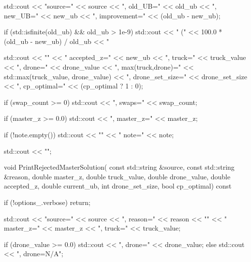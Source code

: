 {{{{                std::cout << " source=" << source
                          << ", old_UB=" << old_ub
                          << ", new_UB=" << new_ub
                          << ", improvement=" << (old_ub - new_ub);

                if (std::isfinite(old_ub) && old_ub > 1e-9)
                {
                    std::cout << " (" << 100.0 * (old_ub - new_ub) / old_ub << "%
                }

                std::cout << "\n"
                          << "           accepted_z=" << new_ub
                          << ", truck=" << truck_value
                          << ", drone=" << drone_value
                          << ", max(truck,drone)=" << std::max(truck_value, drone_value)
                          << ", drone_set_size=" << drone_set_size
                          << ", cp_optimal=" << (cp_optimal ? 1 : 0);

                if (swap_count >= 0)
                {
                    std::cout << ", swaps=" << swap_count;
                }

                if (master_z >= 0.0)
                {
                    std::cout << ", master_z=" << master_z;
                }

                if (!note.empty())
                {
                    std::cout << "\n"
                              << "           note=" << note;
                }

                std::cout << "\n";
            }

            void PrintRejectedMasterSolution(
                const std::string &source,
                const std::string &reason,
                double master_z,
                double truck_value,
                double drone_value,
                double accepted_z,
                double current_ub,
                int drone_set_size,
                bool cp_optimal) const
            {
                if (!options_.verbose)
                {
                    return;
                }

                std::cout << "\n[REJECT] source=" << source
                          << ", reason=" << reason
                          << "\n"
                          << "         master_z=" << master_z
                          << ", truck=" << truck_value;

                if (drone_value >= 0.0)
                {
                    std::cout << ", drone=" << drone_value;
                }
                else
                {
                    std::cout << ", drone=N/A";
                }

}}}}
